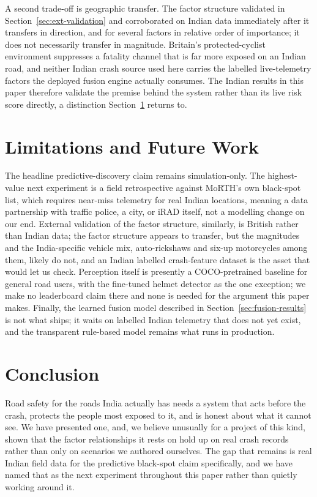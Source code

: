\documentclass[journal]{IEEEtran}
\begin{document}
A second trade-off is geographic transfer. The factor structure validated in Section~\ref{sec:ext-validation} and corroborated on Indian data immediately after it transfers in direction, and for several factors in relative order of importance; it does not necessarily transfer in magnitude. Britain's protected-cyclist environment suppresses a fatality channel that is far more exposed on an Indian road, and neither Indian crash source used here carries the labelled live-telemetry factors the deployed fusion engine actually consumes. The Indian results in this paper therefore validate the premise behind the system rather than its live risk score directly, a distinction Section~\ref{sec:limitations} returns to.

\section{Limitations and Future Work}
\label{sec:limitations}

The headline predictive-discovery claim remains simulation-only. The highest-value next experiment is a field retrospective against MoRTH's own black-spot list, which requires near-miss telemetry for real Indian locations, meaning a data partnership with traffic police, a city, or iRAD itself, not a modelling change on our end. External validation of the factor structure, similarly, is British rather than Indian data; the factor structure appears to transfer, but the magnitudes and the India-specific vehicle mix, auto-rickshaws and six-up motorcycles among them, likely do not, and an Indian labelled crash-feature dataset is the asset that would let us check. Perception itself is presently a COCO-pretrained baseline for general road users, with the fine-tuned helmet detector as the one exception; we make no leaderboard claim there and none is needed for the argument this paper makes. Finally, the learned fusion model described in Section~\ref{sec:fusion-results} is not what ships; it waits on labelled Indian telemetry that does not yet exist, and the transparent rule-based model remains what runs in production.

\section{Conclusion}

Road safety for the roads India actually has needs a system that acts before the crash, protects the people most exposed to it, and is honest about what it cannot see. We have presented one, and, we believe unusually for a project of this kind, shown that the factor relationships it rests on hold up on real crash records rather than only on scenarios we authored ourselves. The gap that remains is real Indian field data for the predictive black-spot claim specifically, and we have named that as the next experiment throughout this paper rather than quietly working around it.
\end{document}
